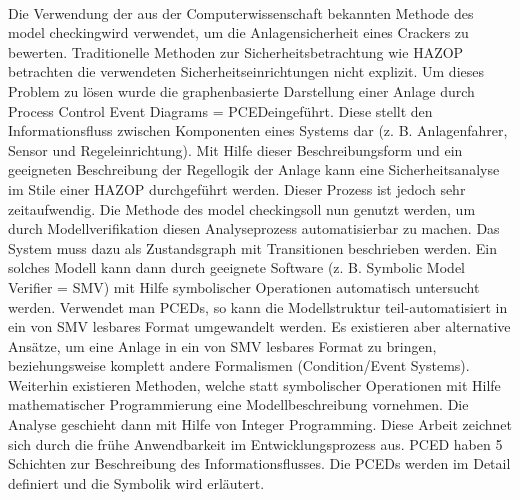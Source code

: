\paragraph*{\cite{Chung_2002}}
Die Verwendung der aus der Computerwissenschaft bekannten Methode des \glqq model checking\grqq { }wird verwendet, um die Anlagensicherheit eines Crackers zu bewerten. \hfill \newline
Traditionelle Methoden zur Sicherheitsbetrachtung wie HAZOP betrachten die verwendeten Sicherheitseinrichtungen nicht explizit. Um dieses Problem zu l\"osen wurde die graphenbasierte Darstellung einer Anlage durch \glqq Process Control Event Diagrams = PCED\grqq { }eingef\"uhrt. Diese stellt den Informationsfluss zwischen Komponenten eines Systems dar (z. B. Anlagenfahrer, Sensor und Regeleinrichtung). Mit Hilfe dieser Beschreibungsform und ein geeigneten Beschreibung der Regellogik der Anlage kann eine Sicherheitsanalyse im Stile einer HAZOP durchgef\"uhrt werden. Dieser Prozess ist jedoch sehr zeitaufwendig. Die Methode des \glqq model checking\grqq { }soll nun genutzt werden, um durch Modellverifikation diesen Analyseprozess automatisierbar zu machen. Das System muss dazu als Zustandsgraph mit Transitionen beschrieben werden. Ein solches Modell kann dann durch geeignete Software (z. B. Symbolic Model Verifier = SMV) mit Hilfe symbolischer Operationen  automatisch untersucht werden. Verwendet man PCEDs, so kann die Modellstruktur teil-automatisiert in ein von SMV lesbares Format umgewandelt werden. Es existieren aber alternative Ans\"atze, um eine Anlage in ein von SMV lesbares Format zu bringen, beziehungsweise komplett andere Formalismen (Condition/Event Systems). Weiterhin existieren Methoden, welche statt symbolischer Operationen mit Hilfe mathematischer Programmierung eine Modellbeschreibung vornehmen. Die Analyse geschieht dann mit Hilfe von \glqq Integer Programming\grqq { }. 
Diese Arbeit zeichnet sich durch die fr\"uhe Anwendbarkeit im Entwicklungsprozess aus. 
PCED haben 5 Schichten zur Beschreibung des Informationsflusses. Die PCEDs werden im Detail definiert und die Symbolik wird erl\"autert. 
